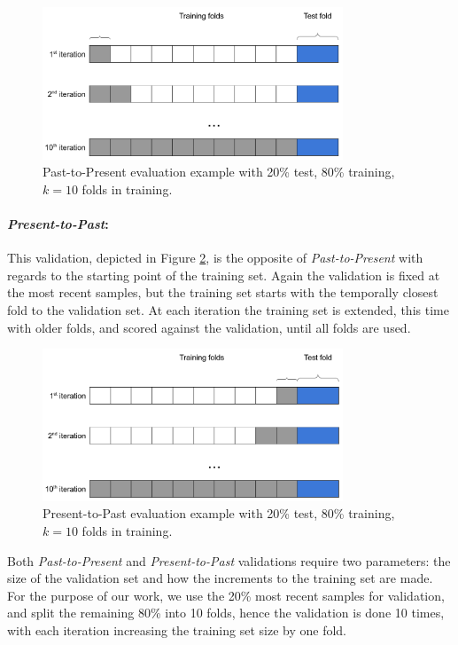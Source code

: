 \begin{figure}[!htb]
	\centering
	\includegraphics[width=0.8\textwidth]{Figures/dia_pastpresent.png}
	\caption[Past-to-Present evaluation example.]{Past-to-Present evaluation example with 20\% test, 80\% training, $k=10$ folds in training.}
	\label{fig:past_present}
\end{figure}

\paragraph{\textit{Present-to-Past}:} This validation, depicted in Figure \ref{fig:present_past}, is the opposite of \textit{Past-to-Present} with regards to the starting point of the training set.
Again the validation is fixed at the most recent samples, but the training set starts with the temporally closest fold to the validation set.
At each iteration the training set is extended, this time with older folds, and scored against the validation, until all folds are used.

\begin{figure}[!htb]
	\centering
	\includegraphics[width=0.8\textwidth]{Figures/dia_presentpast.png}
	\caption[Present-to-Past evaluation example.]{Present-to-Past evaluation example with 20\% test, 80\% training, $k=10$ folds in training.}
	\label{fig:present_past}
\end{figure}

\medskip
Both \textit{Past-to-Present} and \textit{Present-to-Past} validations require two parameters: the size of the validation set and how the increments to the training set are made.
For the purpose of our work, we use the 20\% most recent samples for validation, and split the remaining 80\% into 10 folds, hence the validation is done 10 times, with each iteration increasing the training set size by one fold.

